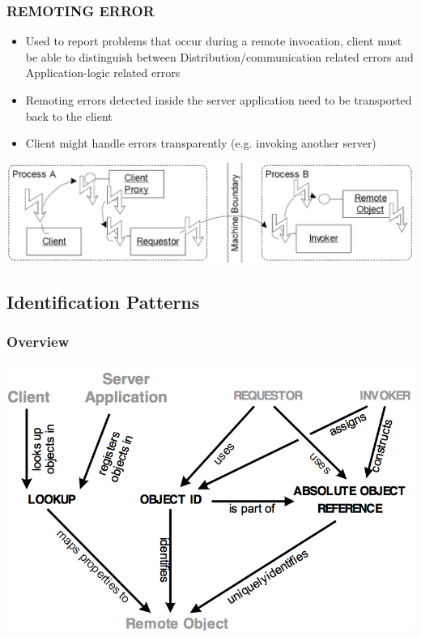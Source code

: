 \documentclass[10pt]{article}
\begin{document}
\subsubsection{REMOTING ERROR}
\begin{itemize}
	\item Used to report problems that occur during a remote invocation, client must be able to distinguish between Distribution/communication related errors and Application-logic related errors
	\item Remoting errors detected inside the server application need to be transported back to the client
	\item Client might handle errors transparently (e.g. invoking another server)
\end{itemize}
\begin{center}
	\includegraphics[scale=0.2]{images/remoting-error.png}
\end{center}
\subsection{Identification Patterns}
\subsubsection{Overview}
\begin{center}
	\includegraphics[scale=0.3]{images/identification-patterns.png}
\end{center}
\end{document}
